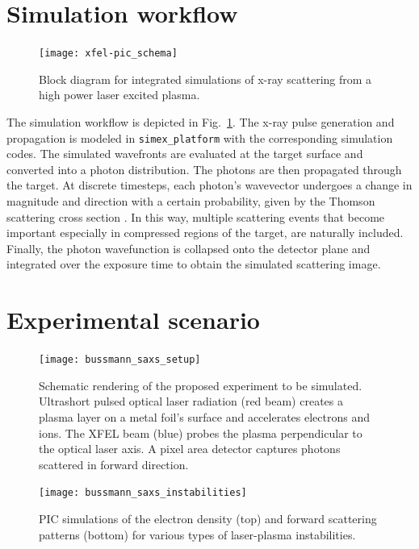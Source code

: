 \documentclass[12pt]{scrartcl}
\begin{document}
\section{Simulation workflow}
%
\begin{figure}[ht]
  \begin{center}
    \texttt{[image: xfel-pic\_schema]}
  \end{center}
  \caption{Block diagram for integrated simulations of x-ray scattering from a high
  power laser excited plasma.}
  \label{fig:xfel-pic_schema}
\end{figure}

The simulation workflow is depicted in Fig.~\ref{fig:xfel-pic_schema}. The x-ray
pulse generation and propagation is modeled in \texttt{simex\_platform} with the
corresponding simulation codes. The simulated wavefronts are evaluated at the
target surface and converted into a photon distribution. The photons are then
propagated through the target. At discrete timesteps, each photon's wavevector
undergoes a change in magnitude and direction with a
certain probability, given by the Thomson scattering cross section
\cite{Jackson1975}. In this way, multiple scattering events that become
important especially in compressed regions of the target, are naturally
included. Finally, the photon wavefunction is collapsed onto the detector plane
and integrated over the exposure time to obtain the simulated scattering image.
%
%
\section{Experimental scenario}
%
\begin{figure}[ht]
  \begin{center}
    \texttt{[image: bussmann\_saxs\_setup]}
  \end{center}
  \caption{Schematic rendering of the proposed experiment to be simulated.
  Ultrashort pulsed optical laser radiation (red beam) creates a plasma layer on
a metal foil's surface and accelerates electrons and ions. The XFEL beam (blue)
probes the plasma perpendicular to the optical laser axis. A pixel area detector
captures photons scattered in forward direction.}
  \label{fig:xfel-saxs_setup}
\end{figure}
%
\begin{figure}[ht]
  \begin{center}
    \texttt{[image: bussmann\_saxs\_instabilities]}
  \end{center}
  \caption{PIC simulations of the electron density (top) and forward scattering
    patterns (bottom) for various
  types of laser-plasma instabilities.}
  \label{fig:saxs_instabilities}
\end{figure}
\end{document}
